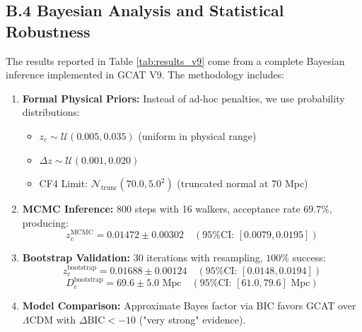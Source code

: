 \documentclass[12pt, a4paper]{article}
\theoremstyle{plain}
\theoremstyle{definition}
\begin{document}
\begin{algorithm}[H]
\SetAlgoLined
{}
\caption{Calculation of resonant opacity for GWs}
\label{alg:gw}
\end{algorithm}

\subsection{B.4 Bayesian Analysis and Statistical Robustness}

The results reported in Table \ref{tab:results_v9} come from a complete Bayesian inference implemented in GCAT V9. The methodology includes:

\begin{enumerate}
    \item \textbf{Formal Physical Priors:} Instead of ad-hoc penalties, we use probability distributions:
    \begin{itemize}
        \item $z_c \sim \mathcal{U}(0.005, 0.035)$ (uniform in physical range)
        \item $\Delta z \sim \mathcal{U}(0.001, 0.020)$
        \item CF4 Limit: $\mathcal{N}_{\text{trunc}}(70.0, 5.0^2)$ (truncated normal at 70 Mpc)
    \end{itemize}
    
    \item \textbf{MCMC Inference:} 800 steps with 16 walkers, acceptance rate $69.7\%$, producing:
    \[
    z_c^{\text{MCMC}} = 0.01472 \pm 0.00302 \quad (\text{95\% CI: } [0.0079, 0.0195])
    \]
    
    \item \textbf{Bootstrap Validation:} 30 iterations with resampling, $100\%$ success:
    \[
    z_c^{\text{bootstrap}} = 0.01688 \pm 0.00124 \quad (\text{95\% CI: } [0.0148, 0.0194])
    \]
    \[
    D_c^{\text{bootstrap}} = 69.6 \pm 5.0 \text{ Mpc} \quad (\text{95\% CI: } [61.0, 79.6] \text{ Mpc})
    \]
    
    \item \textbf{Model Comparison:} Approximate Bayes factor via BIC favors GCAT over $\Lambda$CDM with $\Delta\text{BIC} < -10$ ("very strong" evidence).
\end{enumerate}
\end{document}
